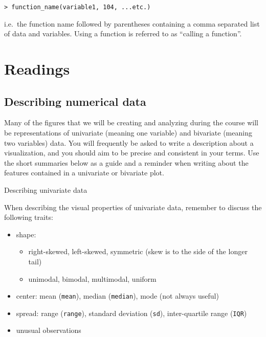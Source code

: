 \documentclass[
]{book}
\begin{document}
\begin{verbatim}
> function_name(variable1, 104, ...etc.)
\end{verbatim}

i.e.~the function name followed by parentheses containing a comma separated list of data and variables. Using a function is referred to as ``calling a function''.

\hypertarget{part-readings}{%
\part{Readings}\label{part-readings}}

\hypertarget{describing-numerical-data}{%
\chapter{Describing numerical data}\label{describing-numerical-data}}

Many of the figures that we will be creating and analyzing during the course will be representations of univariate (meaning one variable) and bivariate (meaning two variables) data.
You will frequently be asked to write a description about a visualization, and you should aim to be precise and consistent in your terms.
Use the short summaries below as a guide and a reminder when writing about the features contained in a univariate or bivariate plot.

{Describing univariate data}

When describing the visual properties of univariate data, remember to discuss the following traits:

\begin{itemize}
\item
  shape:

  \begin{itemize}
  \item
    right-skewed, left-skewed, symmetric (skew is to the side of the longer tail)
  \item
    unimodal, bimodal, multimodal, uniform
  \end{itemize}
\item
  center: mean (\texttt{mean}), median (\texttt{median}), mode (not always useful)
\item
  spread: range (\texttt{range}), standard deviation (\texttt{sd}), inter-quartile range (\texttt{IQR})
\item
  unusual observations
\end{itemize}
\end{document}
